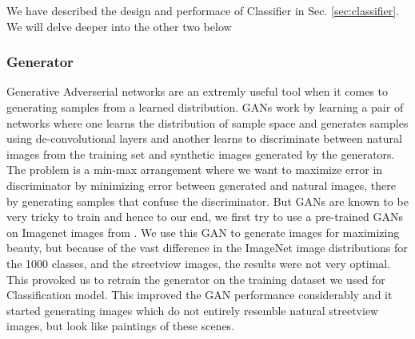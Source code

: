  We have described the design and performace of Classifier in Sec. \ref{sec:classifier}. We will delve deeper into the other two below
 
 \subsubsection{Generator}
 Generative Adverserial networks are an extremly useful tool when it comes to generating samples from a learned distribution\cite{radford2015unsupervised}. GANs work by learning a pair of networks where one learns the distribution of sample space and generates samples using de-convolutional layers and another learns to discriminate between natural images from the training set and synthetic images generated by the generators. The problem is a min-max arrangement where we want to maximize error in discriminator by minimizing error between generated and natural images, there by generating samples that confuse the discriminator. But GANs are known to be very tricky to train \cite{gulrajani2017improved} and hence to our end, we first try to use a pre-trained GANs on Imagenet images from \cite{nguyen2016synthesizing}. We use this GAN to generate images for maximizing beauty, but because of the vast difference in the ImageNet image distributions for the 1000 classes, and the streetview images, the results were not very optimal. This provoked us to retrain the generator on the training dataset we used for Classification model. This improved the GAN performance considerably and it started generating images which do not entirely resemble natural streetview images, but look like paintings of these scenes. 

